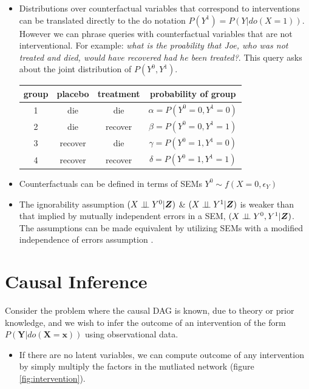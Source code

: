 \documentclass[b0,landscape,25pt]{sciposter}
\begin{document}
\begin{multicols}{5}
\begin{itemize}
\item Distributions over counterfactual variables that correspond to interventions can be translated directly to the do notation $P(Y^{1}) = P(Y|do(X=1))$. However we can phrase queries with counterfactual variables that are not interventional. For example: \textit{what is the proability that Joe, who was not treated and died, would have recovered had he been treated?}. This query asks about the joint distribution of $P(Y^{0},Y^{1})$. 

\begin{center}
\begin{tabular}{c|c|c|c}
group & placebo & treatment & probability of group\\
\hline
1 & die & die & $\alpha=P(Y^{0}=0,Y^{1}=0)$\\
2 & die & recover & $\beta=P(Y^{0}=0,Y^{1}=1)$\\
3 & recover & die & $\gamma=P(Y^{0}=1,Y^{1}=0)$\\
4 & recover & recover & $\delta=P(Y^{0}=1,Y^{1}=1)$\\
\end{tabular}
\end{center}

\item Counterfactuals can be defined in terms of SEMs $Y^0 \sim f(X=0,\epsilon_Y)$ 
\item The ignorability assumption $(X \perp\!\!\!\perp Y^{0}|\boldsymbol{Z})$ \&  $(X\perp\!\!\!\perp Y^{1}|\boldsymbol{Z})$ is weaker than that implied by mutually independent errors in a SEM, $(X \perp\!\!\!\perp Y^0,Y^1 | \boldsymbol{Z})$. The assumptions can be made equivalent by utilizing SEMs with a modified independence of errors assumption \cite{Richardson2013}. 

\end{itemize}



\section*{Causal Inference}

Consider the problem where the causal DAG is known, due to theory or prior knowledge, and we wish to infer the outcome of an intervention of the form $P(\boldsymbol{Y}|do(\boldsymbol{X}=\boldsymbol{x}))$ using observational data.

\begin{itemize}
\item If there are no latent variables, we can compute outcome of any intervention by simply multiply the factors in the mutliated network (figure \ref{fig:intervention}).
\end{itemize}




\end{multicols}
\end{document}

